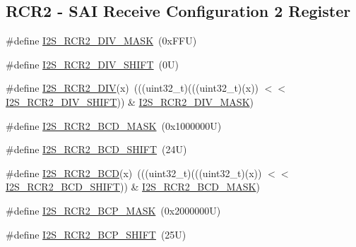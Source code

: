 \subsection*{R\+C\+R2 -\/ S\+AI Receive Configuration 2 Register}
\begin{DoxyCompactItemize}
\item 
\#define \mbox{\hyperlink{group___i2_s___register___masks_ga2a4f6e6b8d73e0abf6f0d5b0979182e2}{I2\+S\+\_\+\+R\+C\+R2\+\_\+\+D\+I\+V\+\_\+\+M\+A\+SK}}~(0x\+F\+F\+U)
\item 
\#define \mbox{\hyperlink{group___i2_s___register___masks_gaa9a14126d11b963220e6b98c027be2e1}{I2\+S\+\_\+\+R\+C\+R2\+\_\+\+D\+I\+V\+\_\+\+S\+H\+I\+FT}}~(0\+U)
\item 
\#define \mbox{\hyperlink{group___i2_s___register___masks_gacee150fec7431041bd054a753160464e}{I2\+S\+\_\+\+R\+C\+R2\+\_\+\+D\+IV}}(x)~(((uint32\+\_\+t)(((uint32\+\_\+t)(x)) $<$$<$ \mbox{\hyperlink{group___i2_s___register___masks_gaa9a14126d11b963220e6b98c027be2e1}{I2\+S\+\_\+\+R\+C\+R2\+\_\+\+D\+I\+V\+\_\+\+S\+H\+I\+FT}})) \& \mbox{\hyperlink{group___i2_s___register___masks_ga2a4f6e6b8d73e0abf6f0d5b0979182e2}{I2\+S\+\_\+\+R\+C\+R2\+\_\+\+D\+I\+V\+\_\+\+M\+A\+SK}})
\item 
\#define \mbox{\hyperlink{group___i2_s___register___masks_gada87418ab4529692585474e6586d0dc2}{I2\+S\+\_\+\+R\+C\+R2\+\_\+\+B\+C\+D\+\_\+\+M\+A\+SK}}~(0x1000000\+U)
\item 
\#define \mbox{\hyperlink{group___i2_s___register___masks_ga13a6f638b14d217719d05d50e7d010ed}{I2\+S\+\_\+\+R\+C\+R2\+\_\+\+B\+C\+D\+\_\+\+S\+H\+I\+FT}}~(24\+U)
\item 
\#define \mbox{\hyperlink{group___i2_s___register___masks_ga8645abb4994f1d9074dfba544c595b86}{I2\+S\+\_\+\+R\+C\+R2\+\_\+\+B\+CD}}(x)~(((uint32\+\_\+t)(((uint32\+\_\+t)(x)) $<$$<$ \mbox{\hyperlink{group___i2_s___register___masks_ga13a6f638b14d217719d05d50e7d010ed}{I2\+S\+\_\+\+R\+C\+R2\+\_\+\+B\+C\+D\+\_\+\+S\+H\+I\+FT}})) \& \mbox{\hyperlink{group___i2_s___register___masks_gada87418ab4529692585474e6586d0dc2}{I2\+S\+\_\+\+R\+C\+R2\+\_\+\+B\+C\+D\+\_\+\+M\+A\+SK}})
\item 
\#define \mbox{\hyperlink{group___i2_s___register___masks_ga2131afd85c44b3770c4f13aa313255d7}{I2\+S\+\_\+\+R\+C\+R2\+\_\+\+B\+C\+P\+\_\+\+M\+A\+SK}}~(0x2000000\+U)
\item 
\#define \mbox{\hyperlink{group___i2_s___register___masks_ga5ab6e46c9fe897adc5d9205c5eed1af4}{I2\+S\+\_\+\+R\+C\+R2\+\_\+\+B\+C\+P\+\_\+\+S\+H\+I\+FT}}~(25\+U)
\item 

\end{DoxyCompactItemize}
